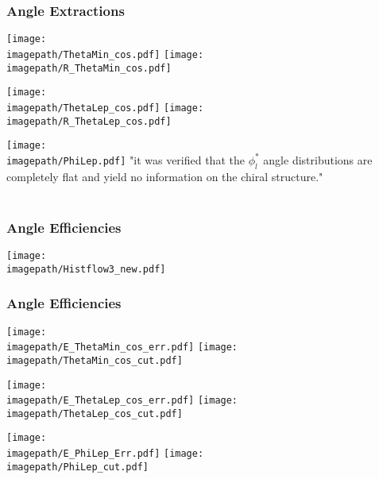 \begin{frame}\frametitle{Angle Extractions }

    \begin{minipage}{0.32\textwidth}
        \texttt{[image: \\imagepath/ThetaMin\_cos.pdf]}
        \texttt{[image: \\imagepath/R\_ThetaMin\_cos.pdf]}
    \end{minipage}\hfill
    \begin{minipage}{0.32\textwidth}
        \texttt{[image: \\imagepath/ThetaLep\_cos.pdf]}
        \texttt{[image: \\imagepath/R\_ThetaLep\_cos.pdf]}
    \end{minipage}
    \begin{minipage}{0.32\textwidth}
        \texttt{[image: \\imagepath/PhiLep.pdf]}
        "it was verified that the ${\phi}_{l}^{*}$ angle distributions are completely flat and yield no information on the chiral structure."
        \\~\\
    \end{minipage}

\end{frame}


\begin{frame}\frametitle{Angle Efficiencies }

    \centering
    \texttt{[image: \\imagepath/Histflow3\_new.pdf]}

\end{frame}


\begin{frame}\frametitle{Angle Efficiencies }

    \begin{minipage}{0.32\textwidth}
        \texttt{[image: \\imagepath/E\_ThetaMin\_cos\_err.pdf]}
        \texttt{[image: \\imagepath/ThetaMin\_cos\_cut.pdf]}
    \end{minipage}\hfill
    \begin{minipage}{0.32\textwidth}
        \texttt{[image: \\imagepath/E\_ThetaLep\_cos\_err.pdf]}
        \texttt{[image: \\imagepath/ThetaLep\_cos\_cut.pdf]}
    \end{minipage}
    \begin{minipage}{0.32\textwidth}
        \texttt{[image: \\imagepath/E\_PhiLep\_Err.pdf]}
        \texttt{[image: \\imagepath/PhiLep\_cut.pdf]}
    \end{minipage}
\end{frame}


